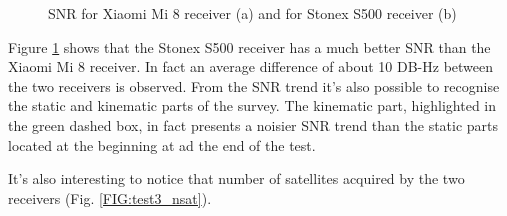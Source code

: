 \begin{figure}[H] 
	\centering
    \caption{SNR for Xiaomi Mi 8 receiver (a) and for Stonex S500 receiver (b) }
	\label{FIG:test3_snr} 
\end{figure}

Figure \ref{FIG:test3_snr} shows that the Stonex S500 receiver has a much better SNR than the Xiaomi Mi 8 receiver. In fact an average difference of about 10 DB-Hz between the two receivers is observed. From the SNR trend it's also possible to recognise the static and kinematic parts of the survey. The kinematic part, highlighted in the green dashed box, in fact presents a noisier SNR trend than the static parts located at the beginning at ad the end of the test.

It's also interesting to notice that number of satellites acquired by the two receivers (Fig. \ref{FIG:test3_nsat}).

